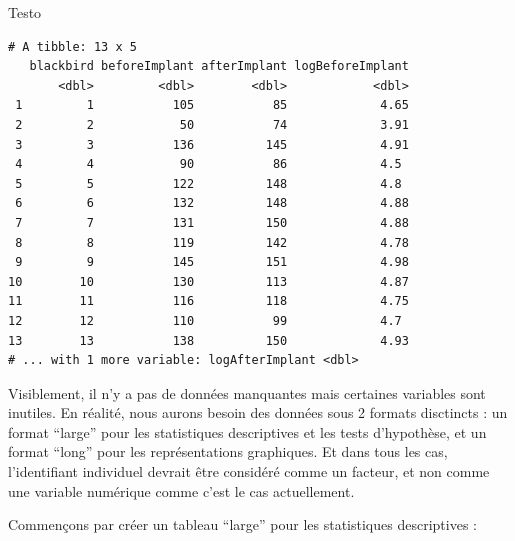 \documentclass[a4paperpaper,]{article}
\newenvironment{Shaded}{\begin{snugshade}}{\end{snugshade}}
\newcommand{\DataTypeTok}[1]{\textcolor[rgb]{0.00,0.34,0.68}{#1}}
\newcommand{\KeywordTok}[1]{\textcolor[rgb]{0.12,0.11,0.11}{\textbf{#1}}}
\newcommand{\NormalTok}[1]{\textcolor[rgb]{0.12,0.11,0.11}{#1}}
\newcommand{\OperatorTok}[1]{\textcolor[rgb]{0.12,0.11,0.11}{#1}}
\newcommand{\StringTok}[1]{\textcolor[rgb]{0.75,0.01,0.01}{#1}}
\begin{document}
\begin{Shaded}
\begin{Highlighting}[]
\NormalTok{Testo}
\end{Highlighting}
\end{Shaded}

\begin{verbatim}
# A tibble: 13 x 5
   blackbird beforeImplant afterImplant logBeforeImplant
       <dbl>         <dbl>        <dbl>            <dbl>
 1         1           105           85             4.65
 2         2            50           74             3.91
 3         3           136          145             4.91
 4         4            90           86             4.5 
 5         5           122          148             4.8 
 6         6           132          148             4.88
 7         7           131          150             4.88
 8         8           119          142             4.78
 9         9           145          151             4.98
10        10           130          113             4.87
11        11           116          118             4.75
12        12           110           99             4.7 
13        13           138          150             4.93
# ... with 1 more variable: logAfterImplant <dbl>
\end{verbatim}

Visiblement, il n'y a pas de données manquantes mais certaines variables sont inutiles. En réalité, nous aurons besoin des données sous 2 formats disctincts : un format ``large'' pour les statistiques descriptives et les tests d'hypothèse, et un format ``long'' pour les représentations graphiques. Et dans tous les cas, l'identifiant individuel devrait être considéré comme un facteur, et non comme une variable numérique comme c'est le cas actuellement.

Commençons par créer un tableau ``large'' pour les statistiques descriptives :

\begin{Shaded}
\end{Shaded}
\end{document}

